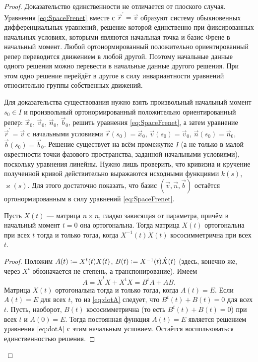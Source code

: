 \begin{proof}
	Доказательство единственности не отличается от плоского случая. Уравнения \eqref{eq:SpaceFrenet} вместе с $\vec{r}^\prime = \vec{v}$ образуют систему обыкновенных дифференциальных уравнений, решение которой единственно при фиксированных начальных условиях, которыми являются начальная точка и базис Френе в начальный момент. Любой ортонормированный положительно ориентированный репер переводится движением в любой другой. Поэтому начальные данные одного решения можно перевести в начальные данные другого решения. При этом одно решение перейдёт в другое в силу инвариантности уравнений относительно группы собственных движений.

	Для доказательства существования нужно взять произвольный начальный момент $s_0 \in I$ и произвольный ортонормированный положительно ориентированный репер: $\vec{x}_0$, $\vec{v}_0$, $\vec{n}_0$, $\vec{b}_0$, решить уравнения \eqref{eq:SpaceFrenet}, а затем уравнение $\vec{r}^\prime = \vec{v}$ с начальными условиями $\vec{r}(s_0) = \vec{x}_0$, $\vec{v}(s_0) = \vec{v}_0$, $\vec{n}(s_0) = \vec{n}_0$, $\vec{b}(s_0) = \vec{b}_0$. Решение существует на всём промежутке $I$ (а не только в малой окрестности точки фазового пространства, заданной начальными условиями), поскольку уравнения линейны. Нужно лишь проверить, что кривизна и кручение полученной кривой действительно выражаются исходными функциями $k(s)$, $\varkappa(s)$. Для этого достаточно показать, что базис $(\vec{v}, \vec{n}, \vec{b})$ остаётся ортонормированным в силу уравнений \eqref{eq:SpaceFrenet}.

	\begin{lemma} \label{eq:FunnyMatrixLemma}
		Пусть $X(t)$ --- матрица $n \times n$, гладко зависящая от параметра, причём в начальный момент $t = 0$ она ортогональна. Тогда матрица $X(t)$ ортогональна при всех $t$ тогда и только тогда, когда $X^{-1}(t)\dot{X}(t)$ кососимметрична при всех $t$.
	\end{lemma}

	\begin{proof}
		Положим $A(t) \vcentcolon = X^t(t)X(t)$, $B(t) \vcentcolon = X^{-1}(t)\dot{X}(t)$ (здесь, конечно же, через $X^t$ обозначается не степень, а транспонирование). Имеем
		\begin{equation} \label{eq:dotA}
			\dot{A} = \dot{X}^t X + X^t\dot{X} = B^t A + AB.
		\end{equation}
		Матрица $X(t)$ ортогональна тогда и только тогда, когда $A(t) = E$. Если $A(t) = E$ для всех $t$, то из \eqref{eq:dotA} следует, что $B^t(t) + B(t) = 0$ для всех $t$. Пусть, наоборот, $B(t)$ кососимметрична (то есть $B^t(t) + B(t) = 0$) при всех $t$ и $A(0) = E$. Тогда постоянная функция $A(t) = E$ является решением уравнения \eqref{eq:dotA} с этим начальным условием. Остаётся воспользоваться единственностью решения.
	\end{proof}


\end{proof}
